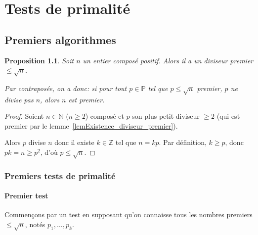 \documentclass[12pt]{report}
\newtheorem{Prop}[thm]{Proposition}
\newcommand{\Z}{\mathbb{Z}}
\begin{document}
 


\chapter{Tests de primalité}


\section{Premiers algorithmes}








\begin{Prop}
Soit $n$ un entier composé positif. Alors il a un diviseur premier $\leq \sqrt{n}$.\par 
Par contraposée, on a donc: si pour tout $p\in \mathbb{P}$ tel que $p\leq \sqrt{n}$ premier, $p$ ne divise pas $n$, alors $n$ est premier.
\end{Prop}

\begin{proof}
Soient $n \in \mathbb{N}$ ($n \geq 2$) composé et $p$ son plus petit diviseur $\geq 2$ (qui est premier par le lemme~\ref{lemExistence_diviseur_premier}). \par 
Alors $p$ divise $n$ donc il existe $k\in \Z$ tel que $n=kp$. Par définition, $k \geq p$, donc $pk=n \geq p^2$, d'où $p \leq \sqrt{n}$.  
\end{proof}



\subsection*{Premiers tests de primalité}

\subsubsection*{Premier test}

Commençons par un test en supposant qu'on connaisse tous les nombres premiers $\leq \sqrt{n}$, notés $p_1, \ldots , p_k $. \\
\end{document}
